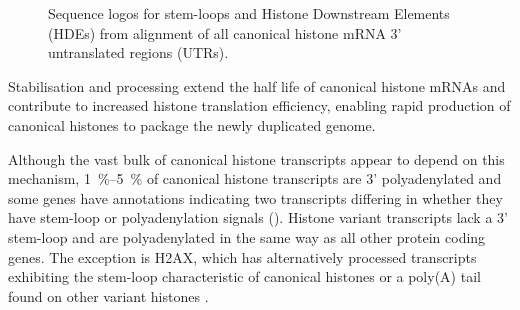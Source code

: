   \begin{figure}
    \centering
    \hfill
    \caption{%
      Sequence logos for stem-loops and Histone Downstream Elements (HDEs)
      from alignment of all canonical histone mRNA 3' untranslated
      regions (UTRs).
    }
  \end{figure}

  Stabilisation and processing extend the half life of canonical histone \mbox{mRNAs}
  and contribute to increased histone translation efficiency,
  enabling rapid production of canonical histones to package the newly duplicated genome.

  Although the vast bulk of canonical histone transcripts appear to depend on this mechanism,
  \SIrange{1}{5}{\percent} of canonical histone transcripts
  are 3' polyadenylated \citep{YangGenomeBiol2011}
  and some genes have annotations indicating two transcripts
  differing in whether they have stem-loop or polyadenylation
  signals ().
  Histone variant transcripts lack a 3' stem-loop and are
  polyadenylated in the same way as all other protein coding genes.
  The exception is H2AX, which has alternatively processed transcripts
  exhibiting the stem-loop characteristic of canonical histones
  or a poly(A) tail found on other variant histones \citep{HTwoAX-transcripts,our-H2AX-review}.

